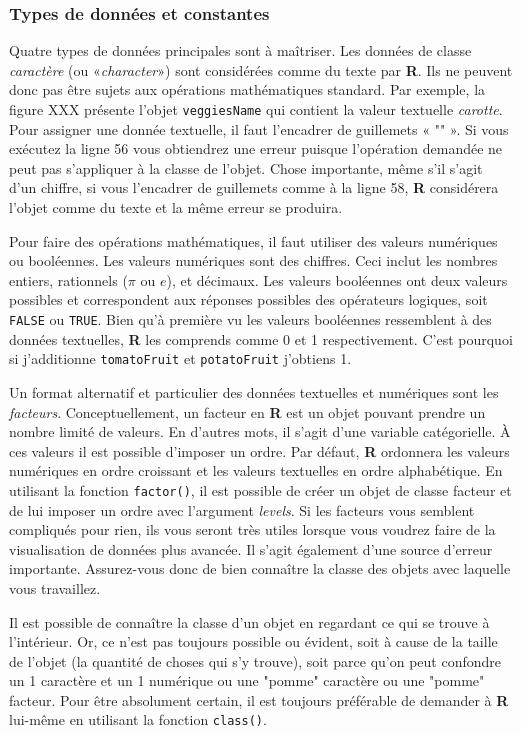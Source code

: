 \documentclass[10.5pt,a4paper]{article}
\begin{document}
    \subsubsection{Types de données et constantes}
    Quatre types de données principales sont à maîtriser. Les données de classe \emph{caractère} (ou «\emph{character}») sont considérées comme du texte par \textbf{R}. Ils ne peuvent donc pas être sujets aux opérations mathématiques standard. Par exemple, la figure XXX présente l'objet \texttt{veggiesName} qui contient la valeur textuelle \emph{carotte}. Pour assigner une donnée textuelle, il faut l'encadrer de guillemets « "" ». Si vous exécutez la ligne 56 vous obtiendrez une erreur puisque l'opération demandée ne peut pas s'appliquer à la classe de l'objet. Chose importante, même s'il s'agit d'un chiffre, si vous l'encadrer de guillemets comme à la ligne 58, \textbf{R} considérera l'objet comme du texte et la même erreur se produira. 
    
    Pour faire des opérations mathématiques, il faut utiliser des valeurs numériques ou booléennes. Les valeurs numériques sont des chiffres. Ceci inclut les nombres entiers, rationnels ($\pi$ ou $e$), et décimaux. Les valeurs booléennes ont deux valeurs possibles et correspondent aux réponses possibles des opérateurs logiques, soit \texttt{FALSE} ou \texttt{TRUE}. Bien qu'à première vu les valeurs booléennes ressemblent à des données textuelles, \textbf{R} les comprends comme 0 et 1 respectivement. C'est pourquoi si j'additionne \texttt{tomatoFruit} et \texttt{potatoFruit} j'obtiens 1.
    
    Un format alternatif et particulier des données textuelles et numériques sont les \emph{facteurs}. Conceptuellement, un facteur en \textbf{R} est un objet pouvant prendre un nombre limité de valeurs. En d'autres mots, il s'agit d'une variable catégorielle. À ces valeurs il est possible d'imposer un ordre. Par défaut, \textbf{R} ordonnera les valeurs numériques en ordre croissant et les valeurs textuelles en ordre alphabétique. En utilisant la fonction \texttt{factor()}, il est possible de créer un objet de classe facteur et de lui imposer un ordre avec l'argument \emph{levels}. Si les facteurs vous semblent compliqués pour rien, ils vous seront très utiles lorsque vous voudrez faire de la visualisation de données plus avancée. Il s'agit également d'une source d'erreur importante. Assurez-vous donc de bien connaître la classe des objets avec laquelle vous travaillez.
    
    Il est possible de connaître la classe d'un objet en regardant ce qui se trouve à l'intérieur. Or, ce n'est pas toujours possible ou évident, soit à cause de la taille de l'objet (la quantité de choses qui s'y trouve), soit parce qu'on peut confondre un 1 caractère et un 1 numérique ou une "pomme" caractère ou une "pomme" facteur. Pour être absolument certain, il est toujours préférable de demander à \textbf{R} lui-même en utilisant la fonction \texttt{class()}.
    
\end{document}
